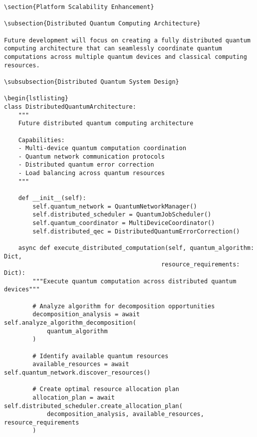 \documentclass[12pt,a4paper]{report}
\begin{document}
\begin{lstlisting}
\section{Platform Scalability Enhancement}

\subsection{Distributed Quantum Computing Architecture}

Future development will focus on creating a fully distributed quantum computing architecture that can seamlessly coordinate quantum computations across multiple quantum devices and classical computing resources.

\subsubsection{Distributed Quantum System Design}

\begin{lstlisting}
class DistributedQuantumArchitecture:
    """
    Future distributed quantum computing architecture

    Capabilities:
    - Multi-device quantum computation coordination
    - Quantum network communication protocols
    - Distributed quantum error correction
    - Load balancing across quantum resources
    """

    def __init__(self):
        self.quantum_network = QuantumNetworkManager()
        self.distributed_scheduler = QuantumJobScheduler()
        self.quantum_coordinator = MultiDeviceCoordinator()
        self.distributed_qec = DistributedQuantumErrorCorrection()

    async def execute_distributed_computation(self, quantum_algorithm: Dict,
                                            resource_requirements: Dict):
        """Execute quantum computation across distributed quantum devices"""

        # Analyze algorithm for decomposition opportunities
        decomposition_analysis = await self.analyze_algorithm_decomposition(
            quantum_algorithm
        )

        # Identify available quantum resources
        available_resources = await self.quantum_network.discover_resources()

        # Create optimal resource allocation plan
        allocation_plan = await self.distributed_scheduler.create_allocation_plan(
            decomposition_analysis, available_resources, resource_requirements
        )


\end{lstlisting}
\end{document}
